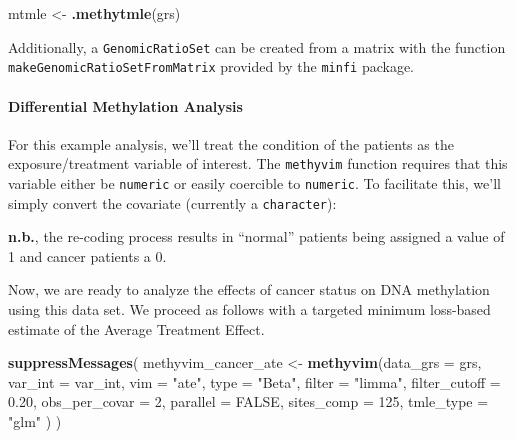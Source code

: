 \documentclass[9pt,a4paper,]{extarticle}
\newenvironment{Shaded}{\begin{snugshade}}{\end{snugshade}}
\newcommand{\DataTypeTok}[1]{\textcolor[rgb]{0.13,0.29,0.53}{#1}}
\newcommand{\DecValTok}[1]{\textcolor[rgb]{0.00,0.00,0.81}{#1}}
\newcommand{\FloatTok}[1]{\textcolor[rgb]{0.00,0.00,0.81}{#1}}
\newcommand{\KeywordTok}[1]{\textcolor[rgb]{0.13,0.29,0.53}{\textbf{#1}}}
\newcommand{\NormalTok}[1]{#1}
\newcommand{\OperatorTok}[1]{\textcolor[rgb]{0.81,0.36,0.00}{\textbf{#1}}}
\newcommand{\OtherTok}[1]{\textcolor[rgb]{0.56,0.35,0.01}{#1}}
\newcommand{\StringTok}[1]{\textcolor[rgb]{0.31,0.60,0.02}{#1}}
\theoremstyle{definition}
\theoremstyle{definition}
\theoremstyle{definition}
\theoremstyle{remark}
\begin{document}
\begin{Shaded}
\begin{Highlighting}[]
\NormalTok{mtmle <-}\StringTok{ }\KeywordTok{.methytmle}\NormalTok{(grs)}
\end{Highlighting}
\end{Shaded}

Additionally, a \texttt{GenomicRatioSet} can be created from a matrix with the
function \texttt{makeGenomicRatioSetFromMatrix} provided by the \texttt{minfi} package.

\hypertarget{differential-methylation-analysis}{%
\paragraph{Differential Methylation Analysis}\label{differential-methylation-analysis}}

For this example analysis, we'll treat the condition of the patients as the
exposure/treatment variable of interest. The \texttt{methyvim} function requires that
this variable either be \texttt{numeric} or easily coercible to \texttt{numeric}. To
facilitate this, we'll simply convert the covariate (currently a \texttt{character}):

\begin{Shaded}
\end{Shaded}

\textbf{n.b.}, the re-coding process results in ``normal'' patients being assigned a
value of 1 and cancer patients a 0.

Now, we are ready to analyze the effects of cancer status on DNA methylation
using this data set. We proceed as follows with a targeted minimum loss-based
estimate of the Average Treatment Effect.

\begin{Shaded}
\begin{Highlighting}[]
\KeywordTok{suppressMessages}\NormalTok{(}
\NormalTok{  methyvim_cancer_ate <-}\StringTok{ }\KeywordTok{methyvim}\NormalTok{(}\DataTypeTok{data_grs =}\NormalTok{ grs, }\DataTypeTok{var_int =}\NormalTok{ var_int,}
                                  \DataTypeTok{vim =} \StringTok{"ate"}\NormalTok{, }\DataTypeTok{type =} \StringTok{"Beta"}\NormalTok{, }\DataTypeTok{filter =} \StringTok{"limma"}\NormalTok{,}
                                  \DataTypeTok{filter_cutoff =} \FloatTok{0.20}\NormalTok{, }\DataTypeTok{obs_per_covar =} \DecValTok{2}\NormalTok{,}
                                  \DataTypeTok{parallel =} \OtherTok{FALSE}\NormalTok{, }\DataTypeTok{sites_comp =} \DecValTok{125}\NormalTok{,}
                                  \DataTypeTok{tmle_type =} \StringTok{"glm"}
\NormalTok{                                 )}
\NormalTok{)}
\end{Highlighting}
\end{Shaded}
\end{document}
